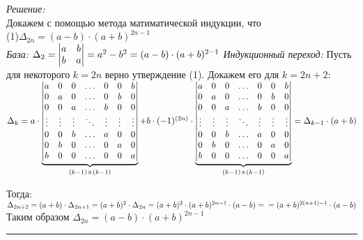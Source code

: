 \documentclass[a4paper, 12pt]{article}
\newenvironment{solution}
{\textit{Решение:}\vspace{.2cm}\\}
{\vspace{.1cm}\noindent\rule{7in}{1.5pt}}
\begin{document}
\begin{solution}

Докажем с помощью метода матиматической индукции, что\\ (1){$\Delta_{2n} = (a-b)\cdot(a+b)^{2n-1}$}\\
\emph{База:} $\Delta_2 = 
\begin{vmatrix}
	a & b\\
	b & a\\
\end{vmatrix} = a^2-b^2 = (a-b) \cdot (a+b)^{2 - 1}\\
$
\emph{Индукционный переход:} Пусть для некоторого $k=2n$ верно утверждение (1). Докажем его для $k=2n+2:$\vspace{.2cm}\\
$\Delta_k = a \cdot
\underbrace{
	\begin{vmatrix}
		a & 0 & 0 & \ldots & 0 & 0 & b\\ 
		0 & a & 0 & \ldots & 0 & b & 0 \\ 
		0 & 0 & a & \ldots & b & 0 & 0 \\ 
		\vdots & \vdots & \vdots & \ddots & \vdots & \vdots & \vdots \\ 
		0 & 0 & b & \ldots & a & 0 & 0 \\ 
		0 & b & 0 & \ldots & 0 & a & 0 \\ 
		b & 0 & 0 & \ldots & 0 & 0 & a\\
	\end{vmatrix}
}_{(k-1) \times (k-1)} + b \cdot (-1)^{(2n)} \cdot
\underbrace{
	\begin{vmatrix}
		a & 0 & 0 & \ldots & 0 & 0 & b\\ 
		0 & a & 0 & \ldots & 0 & b & 0 \\ 
		0 & 0 & a & \ldots & b & 0 & 0 \\ 
		\vdots & \vdots & \vdots & \ddots & \vdots & \vdots & \vdots \\ 
		0 & 0 & b & \ldots & a & 0 & 0 \\ 
		0 & b & 0 & \ldots & 0 & a & 0 \\ 
		b & 0 & 0 & \ldots & 0 & 0 & a\\
\end{vmatrix}}_{(k-1) \times (k-1)} = \Delta_{k-1} \cdot (a+b)\vspace{.2cm}\\$

Тогда: $\Delta_{2n+2} = (a+b) \cdot \Delta_{2n+1} = (a+b)^2 \cdot \Delta_{2n} 
= (a+b)^2 \cdot (a+b)^{2n-1} \cdot (a-b) =\\= (a+b)^{2(n+1)-1} \cdot (a-b)$\\

Таким образом $\Delta_{2n}= (a-b)\cdot(a+b)^{2n-1}$
\end{solution} 
\end{document}

